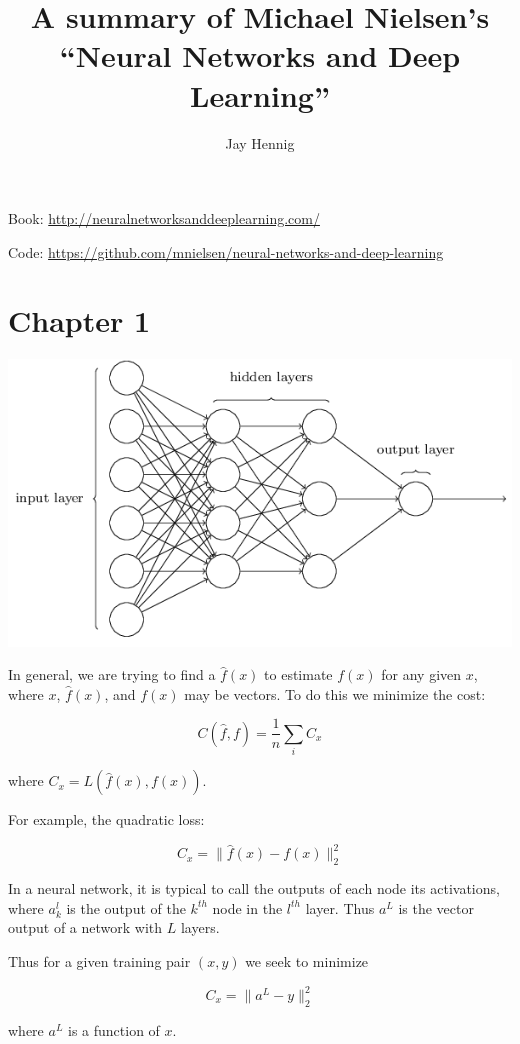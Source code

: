 \documentclass[12pt]{article}
\begin{document}
\title{A summary of Michael Nielsen's ``Neural Networks and Deep Learning''}
\author{Jay Hennig}
 
\maketitle

Book: \url{http://neuralnetworksanddeeplearning.com/}

Code: \url{https://github.com/mnielsen/neural-networks-and-deep-learning}

\section*{Chapter 1}

\includegraphics[scale=0.5]{network}

In general, we are trying to find a $\widehat{f}(x)$ to estimate $f(x)$ for any given $x$, where $x$, $\widehat{f}(x)$, and $f(x)$ may be vectors. To do this we minimize the cost:

$$ C(\widehat{f}, f) = \frac{1}{n} \sum_i C_x$$

where $C_x = L(\widehat{f}(x), f(x))$.

For example, the quadratic loss:

$$ C_x = \| \widehat{f}(x) - f(x) \|_2^2 $$

In a neural network, it is typical to call the outputs of each node its activations, where $a_k^l$ is the output of the $k^{th}$ node in the $l^{th}$ layer. Thus $a^L$ is the vector output of a network with $L$ layers.

Thus for a given training pair $(x,y)$ we seek to minimize

$$ C_x = \| a^L - y \|_2^2 $$

where $a^L$ is a function of $x$.
\end{document}
